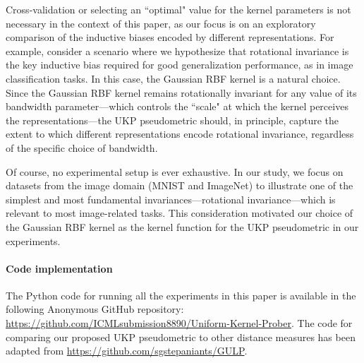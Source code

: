 \documentclass{article}
\theoremstyle{plain}
\newcommand{\metricstname}{UKP }
\begin{document}
Cross-validation or selecting an ``optimal" value for the kernel parameters is not necessary in the context of this paper, as our focus is on an exploratory comparison of the inductive biases encoded by different representations. For example, consider a scenario where we hypothesize that rotational invariance is the key inductive bias required for good generalization performance, as in image classification tasks. In this case, the Gaussian RBF kernel is a natural choice. Since the Gaussian RBF kernel remains rotationally invariant for any value of its bandwidth parameter—which controls the ``scale" at which the kernel perceives the representations—the \metricstname pseudometric should, in principle, capture the extent to which different representations encode rotational invariance, regardless of the specific choice of bandwidth.

Of course, no experimental setup is ever exhaustive. In our study, we focus on datasets from the image domain (MNIST and ImageNet) to illustrate one of the simplest and most fundamental invariances—rotational invariance—which is relevant to most image-related tasks. This consideration motivated our choice of the Gaussian RBF kernel as the kernel function for the \metricstname pseudometric in our experiments.

\paragraph{Code implementation} The Python code for running all the experiments in this paper is available in the following Anonymous GitHub repository: \url{https://github.com/ICMLsubmission8890/Uniform-Kernel-Prober}. The code for comparing our proposed \metricstname pseudometric to other distance measures has been adapted from \url{https://github.com/sgstepaniants/GULP}.  
\end{document}
